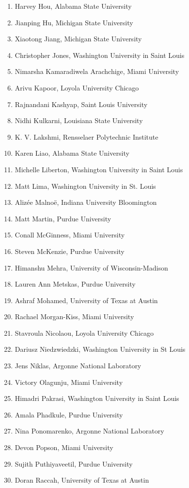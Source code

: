 \begin{multicols}{2}
\begin{enumerate}
\item Harvey	Hou,	Alabama State University
\item Jianping	Hu,	Michigan State University
\item Xiaotong	Jiang,	Michigan State University
\item Christopher	Jones,	Washington University in Saint Louis
\item Nimarsha	Kamaradiwela Arachchige,	Miami University
\item Arivu 	Kapoor,	Loyola University Chicago
\item Rajnandani	Kashyap,	Saint Louis University
\item Nidhi	Kulkarni, 	Louisiana State University 
\item K. V.	Lakshmi,	Rensselaer Polytechnic Institute
\item Karen	Liao,	Alabama State University
\item Michelle	Liberton,	Washington University in Saint Louis
\item Matt	Lima,	Washington University in St. Louis
\item Alizée	Malnoë,	Indiana University Bloomington
\item Matt	Martin,	Purdue University
\item Conall	McGinness,	Miami University 
\item Steven	McKenzie,	Purdue University
\item Himanshu 	Mehra,	University of Wisconsin-Madison
\item Lauren  Ann	Metskas,	Purdue University
\item Ashraf	Mohamed,	University of Texas at Austin
\item Rachael 	Morgan-Kiss,	Miami University
\item Stavroula 	Nicolaou,	Loyola University Chicago 
\item Dariusz	Niedzwiedzki,	Washington University in St Louis
\item Jens	Niklas,	Argonne National Laboratory
\item Victory	Olagunju,	Miami University
\item Himadri	Pakrasi,	Washington University in Saint Louis
\item Amala	Phadkule,	Purdue University
\item Nina	Ponomarenko,	Argonne National Laboratory
\item Devon	Popson,	Miami University
\item Sujith	Puthiyaveetil,	Purdue University 
\item Doran	Raccah,	University of Texas at Austin

\end{enumerate}
\end{multicols}
